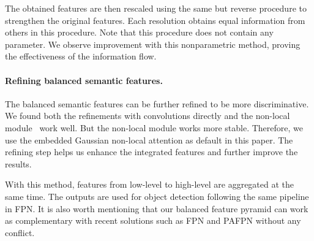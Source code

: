 \documentclass[10pt,twocolumn,letterpaper]{article}
\begin{document}
The obtained features are then rescaled using the same but reverse procedure to strengthen the original features.
Each resolution obtains equal information from others in this procedure.
Note that this procedure does not contain any parameter.
We observe improvement with this nonparametric method, proving the effectiveness of the information flow.

\vspace{-12pt}
\paragraph{Refining balanced semantic features.}
The balanced semantic features can be further refined to be more discriminative.
We found both the refinements with convolutions directly and the non-local module~\cite{nonlocal} work well.
But the non-local module works more stable.
Therefore, we use the embedded Gaussian non-local attention as default in this paper.
The refining step helps us enhance the integrated features and further improve the results.

With this method, features from low-level to high-level are aggregated at the same time.
The outputs  are used for object detection following the same pipeline in FPN.
It is also worth mentioning that our balanced feature pyramid can work as complementary with recent solutions such as FPN and PAFPN without any conflict.
\end{document}
